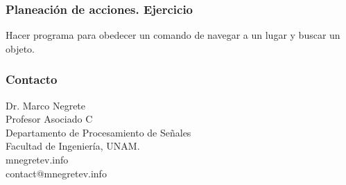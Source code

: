 \documentclass[10pt,spanish,aspectratio=1610]{beamer}
\begin{document}
\begin{frame}\frametitle{Planeación de acciones. Ejercicio}
Hacer programa para obedecer un comando de navegar a un lugar y buscar un objeto.
\end{frame}

\begin{frame}\frametitle{Contacto}
  Dr. Marco Negrete\\
  Profesor Asociado C\\
  Departamento de Procesamiento de Señales\\
  Facultad de Ingeniería, UNAM.
\[\]
  mnegretev.info\\
  contact@mnegretev.info 
\end{frame}
\end{document}
